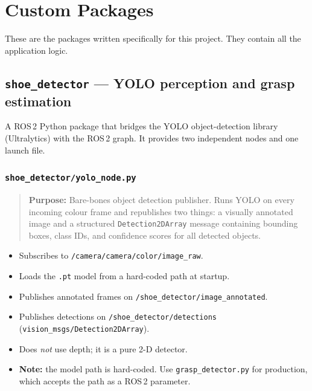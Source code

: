\documentclass[11pt,a4paper]{article}
\newcommand{\file}[1]{\texttt{#1}}
\newcommand{\topic}[1]{\texttt{\small #1}}
\newenvironment{filebox}{%
  \par\vspace{0.3em}\begin{quote}\itshape
}{%
  \end{quote}\vspace{0.3em}%
}
\begin{document}
\newpage
\section{Custom Packages}

These are the packages written specifically for this project.
They contain all the application logic.

\subsection{\texttt{shoe\_detector} --- YOLO perception and grasp estimation}

A ROS\,2 Python package that bridges the YOLO object-detection library
(Ultralytics) with the ROS\,2 graph. It provides two independent nodes and
one launch file.

\subsubsection{\file{shoe\_detector/yolo\_node.py}}

\begin{filebox}
\textbf{Purpose:} Bare-bones object detection publisher. Runs YOLO on every
incoming colour frame and republishes two things: a visually annotated image
and a structured \texttt{Detection2DArray} message containing bounding boxes,
class IDs, and confidence scores for all detected objects.
\end{filebox}

\begin{itemize}
  \item Subscribes to \topic{/camera/camera/color/image\_raw}.
  \item Loads the \file{.pt} model from a hard-coded path at startup.
  \item Publishes annotated frames on \topic{/shoe\_detector/image\_annotated}.
  \item Publishes detections on \topic{/shoe\_detector/detections}
        (\texttt{vision\_msgs/Detection2DArray}).
  \item Does \emph{not} use depth; it is a pure 2-D detector.
  \item \textbf{Note:} the model path is hard-coded. Use
        \file{grasp\_detector.py} for production, which accepts the path as
        a ROS\,2 parameter.
\end{itemize}
\end{document}

